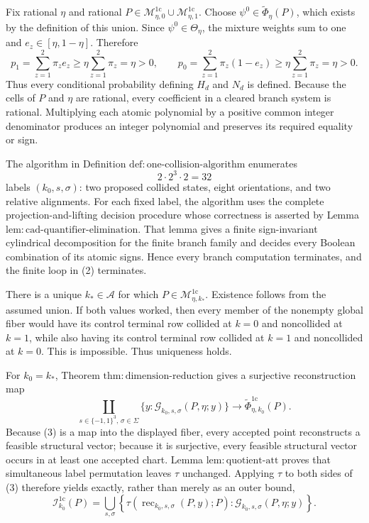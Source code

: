 Fix rational \(\eta\) and rational \(P\in\mathcal M_{\eta,0}^{1\mathrm c}\cup
\mathcal M_{\eta,1}^{1\mathrm c}\).  Choose
\(\psi^0\in\widetilde\Phi_\eta(P)\), which exists by the definition of this
union.  Since \(\psi^0\in\Theta_\eta\), the mixture weights sum to one and
\(e_z\in[\eta,1-\eta]\).  Therefore
\[
p_1=\sum_{z=1}^2\pi_z e_z
   \geq \eta\sum_{z=1}^2\pi_z=\eta>0,
\qquad
p_0=\sum_{z=1}^2\pi_z(1-e_z)
   \geq \eta\sum_{z=1}^2\pi_z=\eta>0.
\tag{1}
\]
Thus every conditional probability defining \(H_d\) and \(N_d\) is defined.
Because the cells of \(P\) and \(\eta\) are rational, every coefficient in a
cleared branch system is rational.  Multiplying each atomic polynomial by a
positive common integer denominator produces an integer polynomial and
preserves its required equality or sign.

The algorithm in Definition
\(\mathrm{def{:}one\text{-}collision\text{-}algorithm}\) enumerates
\[
2\cdot 2^3\cdot 2=32
\tag{2}
\]
labels \((k_0,s,\sigma)\): two proposed collided states, eight orientations,
and two relative alignments.  For each fixed label, the algorithm uses the
complete projection-and-lifting decision procedure whose correctness is
asserted by Lemma \(\mathrm{lem{:}cad\text{-}quantifier\text{-}elimination}\).
That lemma gives a finite sign-invariant cylindrical decomposition for the
finite branch family and decides every Boolean combination of its atomic
signs.  Hence every branch computation terminates, and the finite loop in
(2) terminates.

There is a unique \(k_\ast\in\mathcal A\) for which
\(P\in\mathcal M_{\eta,k_\ast}^{1\mathrm c}\).  Existence follows from the
assumed union.  If both values worked, then every member of the nonempty
global fiber would have its control terminal row collided at \(k=0\) and
noncollided at \(k=1\), while also having its control terminal row collided at
\(k=1\) and noncollided at \(k=0\).  This is impossible.  Thus uniqueness
holds.

For \(k_0=k_\ast\), Theorem
\(\mathrm{thm{:}dimension\text{-}reduction}\) gives a surjective
reconstruction map
\[
\coprod_{s\in\{-1,1\}^3,\,\sigma\in\Sigma}
 \{y:\mathscr G_{k_0,s,\sigma}(P,\eta;y)\}
 \longrightarrow
 \widetilde\Phi_{\eta,k_0}^{1\mathrm c}(P).
\tag{3}
\]
Because (3) is a map into the displayed fiber, every accepted point
reconstructs a feasible structural vector; because it is surjective, every
feasible structural vector occurs in at least one accepted chart.  Lemma
\(\mathrm{lem{:}quotient\text{-}att}\) proves that simultaneous label
permutation leaves \(\tau\) unchanged.  Applying \(\tau\) to both sides of
(3) therefore yields exactly, rather than merely as an outer bound,
\[
\mathcal I_{k_0}^{1\mathrm c}(P)
=\bigcup_{s,\sigma}
 \left\{
 \tau\!\left(\operatorname{rec}_{k_0,s,\sigma}(P,y);P\right):
 \mathscr G_{k_0,s,\sigma}(P,\eta;y)
 \right\}.
\tag{4}
\]

